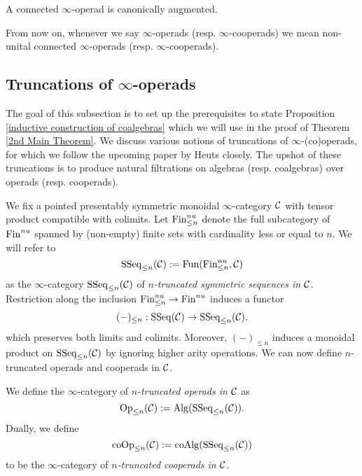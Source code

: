 \begin{remark}
A connected $\infty$-operad is canonically augmented.
\end{remark}  

\begin{remark}
From now on, whenever we say $\infty$-operads (resp. $\infty$-cooperads) we mean non-unital connected $\infty$-operads (resp. $\infty$-cooperads).
\end{remark}


\subsection{Truncations of $\infty$-operads}
The goal of this subsection is to set up the prerequisites to state Proposition \ref{inductive construction of coalgebras}  \cite[Theorem 4.12]{Heuts_Koszul} which we will use in the proof of Theorem \ref{2nd Main Theorem}. 
We discuss various notions of truncations of $\infty$-(co)operads, for which we follow the upcoming paper by Heuts \cite{Heuts_Koszul} closely. The upshot of these truncations is to produce natural filtrations on algebras (resp. coalgebras) over operads (resp. cooperads). 


We fix a pointed presentably symmetric monoidal $\infty$-category ${\mathcal{C}}$ with tensor product compatible with colimits.
Let $\operatorname{Fin}^{nu}_{\leq n}$ denote the full subcategory of $\operatorname{Fin}^{nu}$ spanned by (non-empty) finite sets with cardinality less or equal to $n$.
We will refer to
$$
\operatorname{SSeq}_{\leq n}({\mathcal{C}}):=\operatorname{Fun}(\operatorname{Fin}^{nu}_{\leq n}, {\mathcal{C}})
$$ 
as the $\infty$-category $\operatorname{SSeq}_{\leq n}({\mathcal{C}})$ of \emph{$n$-truncated symmetric sequences in ${\mathcal{C}}$}.
Restriction along the inclusion $\operatorname{Fin}^{nu}_{\leq n}\to \operatorname{Fin}^{nu}$ induces a
functor 
$$
(-)_{\leq n}: \operatorname{SSeq}({\mathcal{C}}) \to 
\operatorname{SSeq}_{\leq n}({\mathcal{C}}).
$$
which preserves both limits and colimits. Moreover, $(-)_{\leq n}$ induces a
monoidal product on $\operatorname{SSeq}_{\leq n}({\mathcal{C}})$ by ignoring higher arity operations.
We can now define $n$-truncated operads and cooperads in ${\mathcal{C}}$.
\begin{definition}
    We define the $\infty$-category of \emph{$n$-truncated operads in ${\mathcal{C}}$} as 
    $$
    \operatorname{Op}_{\leq n}({\mathcal{C}}) :=\operatorname{Alg}(\operatorname{SSeq}_{\leq n}({\mathcal{C}})).
    $$
    Dually, we define 
    $$
     \operatorname{coOp}_{\leq n}({\mathcal{C}}) := \operatorname{coAlg}(\operatorname{SSeq}_{\leq n}({\mathcal{C}})) 
    $$
    to be the $\infty$-category of \emph{$n$-truncated cooperads in ${\mathcal{C}}$}.
\end{definition}

